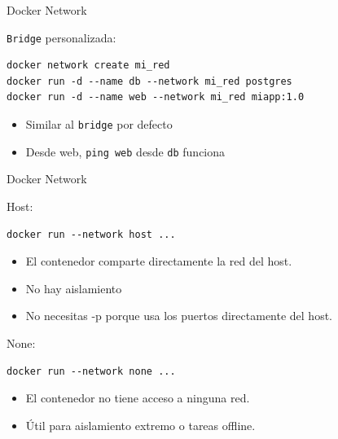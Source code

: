 \documentclass{beamer}
\begin{document}
\begin{frame}[fragile]{Docker Network}

\texttt{Bridge} personalizada:
    \begin{verbatim}
docker network create mi_red
docker run -d --name db --network mi_red postgres
docker run -d --name web --network mi_red miapp:1.0
\end{verbatim}
\begin{itemize}
    \item Similar al \texttt{bridge} por defecto
    \item Desde web, \texttt{ping web} desde \texttt{db} funciona
\end{itemize}
    
\end{frame}

\begin{frame}[fragile]{Docker Network}

Host:
    \begin{verbatim}
docker run --network host ...
\end{verbatim}

\begin{itemize}
    \item El contenedor comparte directamente la red del host.

\item No hay aislamiento 

\item No necesitas -p porque usa los puertos directamente del host.

\end{itemize}

None:

\begin{verbatim}
docker run --network none ...
\end{verbatim}

\begin{itemize}
    \item El contenedor no tiene acceso a ninguna red.

 \item Útil para aislamiento extremo o tareas offline.
\end{itemize}

    
\end{frame}
\end{document}
